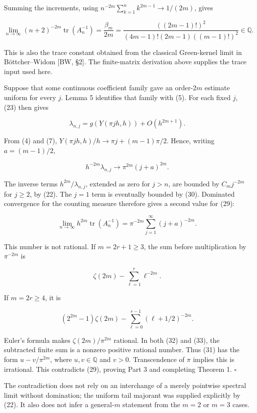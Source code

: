 \documentclass[10pt,a4paper]{article}
\begin{document}
Summing the increments, using \(n^{-2m}\sum_{k=1}^n k^{2m-1}\to1/(2m)\), gives

\nopagebreak[3]
\[
\lim_{n\to\infty}(n+2)^{-2m}\operatorname{tr}(A_n^{-1})
=\frac{\beta_m}{2m}
=\frac{((2m-1)!)^2}{(4m-1)!(2m-1)((m-1)!)^2}
\in\mathbb Q.
\tag{29}
\]

This is also the trace constant obtained from the classical Green-kernel limit in Böttcher--Widom {[}BW, §2{]}. The finite-matrix derivation above supplies the trace input used here.

Suppose that some continuous coefficient family gave an order-\(2m\) estimate uniform for every \(j\). Lemma 5 identifies that family with (5). For each fixed \(j\), (23) then gives

\nopagebreak[3]
\[
\lambda_{n,j}=g(Y(\pi jh,h))+O(h^{2m+1}).
\]

From (4) and (7), \(Y(\pi jh,h)/h\to\pi j+(m-1)\pi/2\). Hence, writing \(a=(m-1)/2\),

\nopagebreak[3]
\[
h^{-2m}\lambda_{n,j}\longrightarrow \pi^{2m}(j+a)^{2m}.
\tag{30}
\]

The inverse terms \(h^{2m}/\lambda_{n,j}\), extended as zero for \(j>n\), are bounded by \(C_m j^{-2m}\) for \(j\ge2\), by (22). The \(j=1\) term is eventually bounded by (30). Dominated convergence for the counting measure therefore gives a second value for (29):

\nopagebreak[3]
\[
\lim_{n\to\infty}h^{2m}\operatorname{tr}(A_n^{-1})
=\pi^{-2m}\sum_{j=1}^{\infty}(j+a)^{-2m}.
\tag{31}
\]

This number is not rational. If \(m=2r+1\ge3\), the sum before multiplication by \(\pi^{-2m}\) is

\nopagebreak[3]
\[
\zeta(2m)-\sum_{\ell=1}^{r}\ell^{-2m}.
\tag{32}
\]

If \(m=2r\ge4\), it is

\nopagebreak[3]
\[
(2^{2m}-1)\zeta(2m)-\sum_{\ell=0}^{r-1}(\ell+1/2)^{-2m}.
\tag{33}
\]

Euler's formula makes \(\zeta(2m)/\pi^{2m}\) rational. In both (32) and (33), the subtracted finite sum is a nonzero positive rational number. Thus (31) has the form \(u-v/\pi^{2m}\), where \(u,v\in\mathbb Q\) and \(v>0\). Transcendence of \(\pi\) implies this is irrational. This contradicts (29), proving Part 3 and completing Theorem 1. \(\square\)

The contradiction does not rely on an interchange of a merely pointwise spectral limit without domination; the uniform tail majorant was supplied explicitly by (22). It also does not infer a general-\(m\) statement from the \(m=2\) or \(m=3\) cases.
\end{document}
